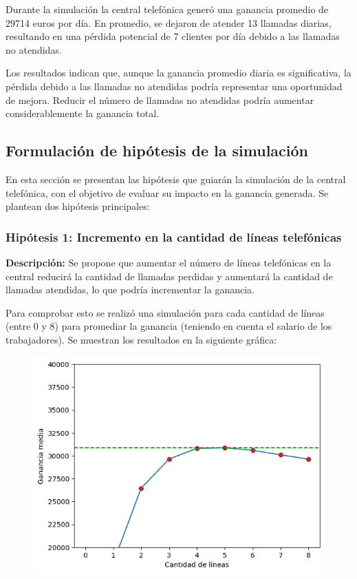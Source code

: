 \documentclass{article}
\begin{document}
		Durante la simulación la central telefónica generó una ganancia promedio de 29714 euros por día. En promedio, se dejaron de atender 13 llamadas diarias, resultando en una pérdida potencial de 7 clientes por día debido a las llamadas no atendidas.
		
		Los resultados indican que, aunque la ganancia promedio diaria es significativa, la pérdida debido a las llamadas no atendidas podría representar una oportunidad de mejora. Reducir el número de llamadas no atendidas podría aumentar considerablemente la ganancia total.
		
		\subsection*{Formulación de hipótesis de la simulación}
			En esta sección se presentan las hipótesis que guiarán la simulación de la central telefónica, con el objetivo de evaluar su impacto en la ganancia generada. Se plantean dos hipótesis principales:
			
			\subsubsection*{Hipótesis 1: Incremento en la cantidad de líneas telefónicas}
			
			\textbf{Descripción:} Se propone que aumentar el número de líneas telefónicas en la central reducirá la cantidad de llamadas perdidas y aumentará la cantidad de llamadas atendidas, lo que podría incrementar la ganancia.
			
			Para comprobar esto se realizó una simulación para cada cantidad de líneas (entre 0 y 8) para promediar la ganancia (teniendo en cuenta el salario de los trabajadores). Se muestran los resultados en la siguiente gráfica:
			
				\begin{figure}[H]
				\centering
				\includegraphics[width=0.7\linewidth]{./output.png}
				\label{fig:enter-label}
			\end{figure}
			
\end{document}
